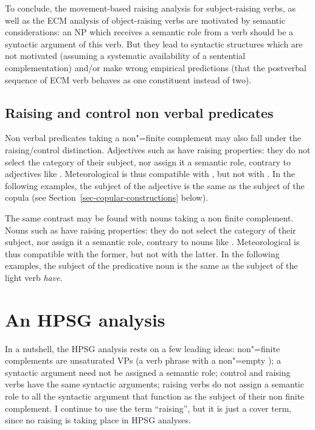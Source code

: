 \documentclass[output=paper
	        ,collection
	        ,collectionchapter
 	        ,biblatex
                ,babelshorthands
                ,newtxmath
                ,draftmode
                ,colorlinks, citecolor=brown
]{langscibook}
\begin{document}
To conclude, the movement-based raising analysis for subject-raising verbs, as well as the ECM analysis of object-raising verbs are motivated by semantic considerations: an NP which receives a semantic role from a verb should be a syntactic argument of this verb. But they lead to syntactic structures which are not motivated (assuming a systematic availability of a sentential complementation) and/or make wrong empirical predictions (that the postverbal sequence of ECM verb behaves as one constituent instead of two).
 
\subsection{Raising and control non verbal predicates}\label{nonverbal}

Non verbal predicates taking a non"=finite complement may also fall under the raising/control distinction.  Adjectives such as  have raising properties: they do not select the category of their subject, nor assign it a semantic role, contrary to adjectives like . Meteorological  is thus compatible with , but not with . In the following examples, the subject of the adjective is the same as the subject of the copula (see Section~\ref{sec-copular-constructions} below).

\eal
{}
\zl

The same contrast may be found with  nouns taking a non finite complement. Nouns such as  have raising properties: they do not select the category of their subject, nor assign it a semantic role, contrary to nouns like . Meteorological  is thus compatible with the former, but not with the latter. In the following examples, the subject of the predicative noun is the same as the subject of the light verb \emph{have}.


\eal
{}
\zl

\section{An HPSG analysis}


In a nutshell, the HPSG analysis rests on a few leading ideas: non"=finite complements are unsaturated VPs (a verb phrase with a non"=empty \subjl); a syntactic argument need not be assigned a semantic role; control and raising verbs have the same syntactic arguments; raising verbs do not assign a semantic role to all the syntactic argument that function as the subject of their non finite complement. I continue to use the term ``raising'', but it is just a cover term, since no raising is taking place in HPSG analyses.
\end{document}
